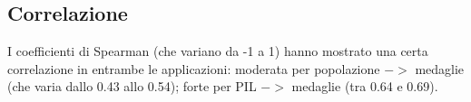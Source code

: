 \subsection{Correlazione}\label{sec:results_correlation}




%
%
%



I coefficienti di Spearman (che variano da -1 a 1) hanno mostrato una certa
correlazione in entrambe le applicazioni: moderata per popolazione $->$ medaglie
(che varia dallo 0.43 allo 0.54); forte per PIL $->$ medaglie (tra 0.64 e 0.69).

